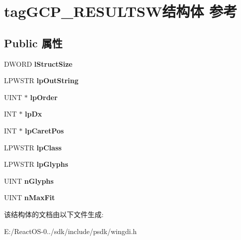 \hypertarget{structtag_g_c_p___r_e_s_u_l_t_s_w}{}\section{tag\+G\+C\+P\+\_\+\+R\+E\+S\+U\+L\+T\+S\+W结构体 参考}
\label{structtag_g_c_p___r_e_s_u_l_t_s_w}
\subsection*{Public 属性}
\begin{DoxyCompactItemize}
\item 
\mbox{\label{structtag_g_c_p___r_e_s_u_l_t_s_w_aaac9b4d4bd2d61e548355754fd960f53}} 
D\+W\+O\+RD {\bfseries l\+Struct\+Size}
\item 
\mbox{\label{structtag_g_c_p___r_e_s_u_l_t_s_w_a3717faa88f51c3fc1d5e4c6dcd6b307e}} 
L\+P\+W\+S\+TR {\bfseries lp\+Out\+String}
\item 
\mbox{\label{structtag_g_c_p___r_e_s_u_l_t_s_w_a3eba6fda44256262d0643ba0c833925b}} 
U\+I\+NT $\ast$ {\bfseries lp\+Order}
\item 
\mbox{\label{structtag_g_c_p___r_e_s_u_l_t_s_w_a96bf941115d69e10df11a6680b165efc}} 
I\+NT $\ast$ {\bfseries lp\+Dx}
\item 
\mbox{\label{structtag_g_c_p___r_e_s_u_l_t_s_w_a041820a1e2ffe592eaf36a980445e433}} 
I\+NT $\ast$ {\bfseries lp\+Caret\+Pos}
\item 
\mbox{\label{structtag_g_c_p___r_e_s_u_l_t_s_w_a120dd854cb269ac3268e9df678a8f0b1}} 
L\+P\+W\+S\+TR {\bfseries lp\+Class}
\item 
\mbox{\label{structtag_g_c_p___r_e_s_u_l_t_s_w_a7035c440249c7ad56b9d42d3ae95a8d2}} 
L\+P\+W\+S\+TR {\bfseries lp\+Glyphs}
\item 
\mbox{\label{structtag_g_c_p___r_e_s_u_l_t_s_w_a573d67f8feff3df67d968bdcbb9bea55}} 
U\+I\+NT {\bfseries n\+Glyphs}
\item 
\mbox{\label{structtag_g_c_p___r_e_s_u_l_t_s_w_a776375539042887eddff8baa61e5c4d2}} 
U\+I\+NT {\bfseries n\+Max\+Fit}
\end{DoxyCompactItemize}


该结构体的文档由以下文件生成\+:\begin{DoxyCompactItemize}
\item 
E\+:/\+React\+O\+S-\/0../sdk/include/psdk/wingdi.\+h\end{DoxyCompactItemize}
